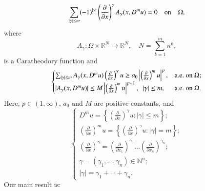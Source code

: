 \documentclass[12pt]{amsart}
\begin{document}
\begin{equation}\label{e21}
  \sum_{|\gamma| \leq m} (-1)^{|\gamma|} \left(\frac{\partial}{\partial x}\right)^{\gamma} A_{\gamma}(x, D^{m}u) =
  0\quad\hbox{on}\quad\Omega,
\end{equation}
where
$$
A_{\gamma}: \Omega \times \mathbb R^{N} \rightarrow \mathbb R^N,\quad N=\sum_{k=1}^m n^k,
$$
is a Caratheodory function and
\begin{equation}\label{e22}
\begin{cases}
\sum_{|\gamma|\le m} A_{\gamma}(x, D^{m}u)
\left(\frac{\partial}{\partial x}\right)^{\gamma} u\geq a_{0}
\left|\left(\frac{\partial}{\partial x}\right)^{m}
u\right|^{p}, & \hbox{a.e.\ on}\ \Omega;\\
|A_{\gamma}(x, D^{m}u)| \leq M
\left|\left(\frac{\partial}{\partial x}\right)^{m} u\right|^{p -
1},\ \ |\gamma| \leq m, & \hbox{a.e.\ on}\ \Omega.
\end{cases}
\end{equation}
Here, $p\in (1,\infty)$, $a_0$ and $M$ are positive constants, and
$$
\begin{cases}
D^{m}u =\left\{ \left(\frac{\partial}{\partial x}\right)^{\gamma}u:
|\gamma| \leq m\right\};\\
\left(\frac{\partial}{\partial
x}\right)^{m} u=\left\{
  \left(\frac{\partial}{\partial x}\right)^{\gamma}u: |\gamma| = m\right\};\\
\left(\frac{\partial}{\partial x}\right)^{\gamma} = \left(\frac{\partial}{\partial x_1}\right)^{\gamma_1} \ldots \left(\frac{\partial}{\partial x_n}\right)^{\gamma_n};\\
\gamma =(\gamma_1, \ldots, \gamma_n)\in\mathbb N^n;\\
|\gamma| =\gamma_1+ \cdots + \gamma_n.
\end{cases}
$$
Our main result is:
\end{document}
